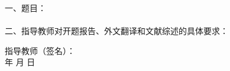 
\newpage
\thispagestyle{empty}

\begin{tabbing}
\hspace{5mm}\songti\sihao 一、题目：\underline{}
\\ \\
\hspace{5mm}\songti\sihao 二、指导教师对开题报告、外文翻译和文献综述的具体要求：
\end{tabbing}

\vspace{140mm}

\begin{tabbing}
\hspace{80mm}\songti\xiaosi 指导教师（签名）：
\\ \hspace{90mm} \songti\xiaosi 年 \hspace{5mm} \songti\xiaosi 月 \hspace{5mm} \songti\xiaosi 日
\end{tabbing}


